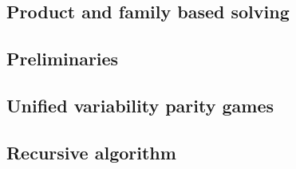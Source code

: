 \subsection{Product and family based solving}


\subsection{Preliminaries}


\subsection{Unified variability parity games}
\label{sec_unified_pg}


\subsection{Recursive algorithm}

